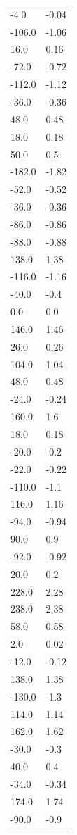 \begin{longtable}{ll}
-4.0 & -0.04 \\
-106.0 & -1.06 \\
16.0 & 0.16 \\
-72.0 & -0.72 \\
-112.0 & -1.12 \\
-36.0 & -0.36 \\
48.0 & 0.48 \\
18.0 & 0.18 \\
50.0 & 0.5 \\
-182.0 & -1.82 \\
-52.0 & -0.52 \\
-36.0 & -0.36 \\
-86.0 & -0.86 \\
-88.0 & -0.88 \\
138.0 & 1.38 \\
-116.0 & -1.16 \\
-40.0 & -0.4 \\
0.0 & 0.0 \\
146.0 & 1.46 \\
26.0 & 0.26 \\
104.0 & 1.04 \\
48.0 & 0.48 \\
-24.0 & -0.24 \\
160.0 & 1.6 \\
18.0 & 0.18 \\
-20.0 & -0.2 \\
-22.0 & -0.22 \\
-110.0 & -1.1 \\
116.0 & 1.16 \\
-94.0 & -0.94 \\
90.0 & 0.9 \\
-92.0 & -0.92 \\
20.0 & 0.2 \\
228.0 & 2.28 \\
238.0 & 2.38 \\
58.0 & 0.58 \\
2.0 & 0.02 \\
-12.0 & -0.12 \\
138.0 & 1.38 \\
-130.0 & -1.3 \\
114.0 & 1.14 \\
162.0 & 1.62 \\
-30.0 & -0.3 \\
40.0 & 0.4 \\
-34.0 & -0.34 \\
174.0 & 1.74 \\
-90.0 & -0.9 \\

\end{longtable}
